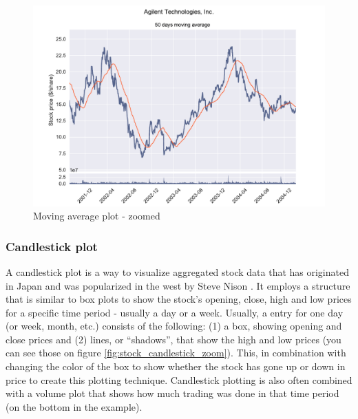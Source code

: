 \documentclass[12pt, a4paper]{article}
\begin{document}
\begin{figure}[H]
    \centering
    \includegraphics[width=\textwidth]{src/stocks/simple/movingavg_zoom}
    \caption{Moving average plot - zoomed}
    \label{fig:stock_movingavg_zoom}
\end{figure}

\subsubsection{Candlestick plot}

A candlestick plot is a way to visualize aggregated stock data that has originated in Japan and was popularized in the west by Steve Nison \cite{candlestick}. It employs a structure that is similar to box plots to show the stock’s opening, close, high and low prices for a specific time period - usually a day or a week. Usually, a entry for one day (or week, month, etc.) consists of the following: (1) a box, showing opening and close prices and (2) lines, or “shadows”, that show the high and low prices (you can see those on figure \ref{fig:stock_candlestick_zoom}). This, in combination with changing the color of the box to show whether the stock has gone up or down in price to create this plotting technique. Candlestick plotting is also often combined with a volume plot that shows how much trading was done in that time period (on the bottom in the example).
\end{document}
